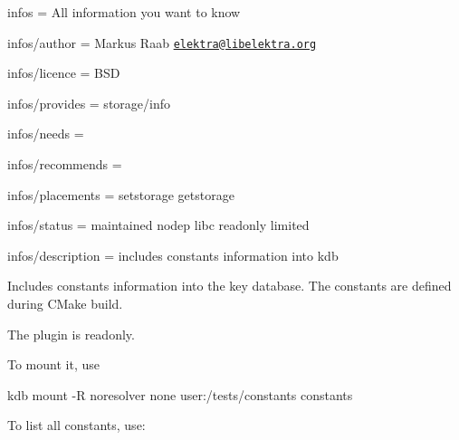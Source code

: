 
\begin{DoxyItemize}
\item infos = All information you want to know
\item infos/author = Markus Raab \href{mailto:elektra@libelektra.org}{\tt elektra@libelektra.\+org}
\item infos/licence = B\+SD
\item infos/provides = storage/info
\item infos/needs =
\item infos/recommends =
\item infos/placements = setstorage getstorage
\item infos/status = maintained nodep libc readonly limited
\item infos/description = includes constants information into kdb
\end{DoxyItemize}

Includes constants information into the key database. The constants are defined during C\+Make build.

The plugin is readonly.

To mount it, use


\begin{DoxyCode}
kdb mount -R noresolver none user:/tests/constants constants
\end{DoxyCode}


To list all constants, use\+:


